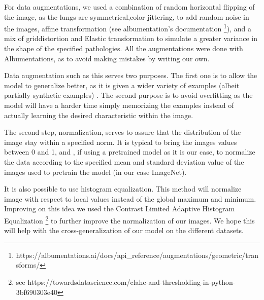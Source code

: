 \documentclass[11pt]{article}
\begin{document}
    For data augmentations, we used a combination of random horizontal flipping of the image, as the lungs are symmetrical,color jittering, to add random noise
    in the images, affine transformation (see albumentation's documentation \footnote{https://albumentations.ai/docs/api_reference/augmentations/geometric/transforms/}), and a mix of griddistortion and Elastic transformation to simulate a greater
    variance in the shape of the specified pathologies. All the augmentations were done with Albumentations, as to avoid making mistakes
    by writing our own\cite{albumentations}.

    Data augmentation such as this serves two purposes. The first one is to allow the model to generalize better, as it is given
    a wider variety of examples (albeit partially synthetic examples) . The second purpose is to avoid overfitting as the model will
    have a harder time simply memorizing the examples instead of actually learning the desired characteristic within the image.

    The second step, normalization, serves to assure that the distribution of the image stay within a specified norm. It is typical
    to bring the images values between 0 and 1, and , if using a pretrained model as it is our case, to normalize the data
    according to the specified mean and standard deviation value of the images used to pretrain the model (in our case ImageNet).

    It is also possible to use histogram equalization. This method will normalize image with respect to local values instead of the global maximum and minimum.
    Improving on this idea we used the Contrast Limited Adaptive Histogram Equalization \footnote{see https://towardsdatascience.com/clahe-and-thresholding-in-python-3bf690303e40}
    to further improve the normalization of our images. We hope this will help with the cross-generalization of our model on the different datasets.

\end{document}
